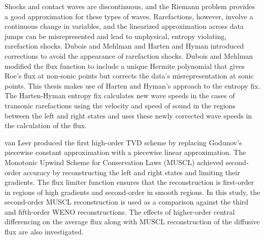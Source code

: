 Shocks and contact waves are discontinuous, and the Riemann problem provides a good approximation for these types of waves. Rarefactions, however, involve a continuous change in variables, and the linearized approximation across data jumps can be misrepresented and lead to unphysical, entropy violating, rarefaction shocks.  Dubois and Mehlman \cite{DUBOISMEHLMAN1993311} and Harten and Hyman \cite{HARTEN1983235} introduced corrections to avoid the appearance of rarefaction shocks. Dubois and Mehlman modified the flux function to include a unique Hermite polynomial that gives Roe's flux at non-sonic points but corrects the data's misrepresentation at sonic points. This thesis makes use of Harten and Hyman's approach to the entropy fix. The Harten-Hyman entropy fix calculates new wave speeds in the cases of transonic rarefactions using the velocity and speed of sound in the regions between the left and right states and uses these newly corrected wave speeds in the calculation of the flux.

van Leer \cite{VANLEER1979101} produced the first high-order TVD scheme by replacing Godunov's piecewise constant approximation with a piecewise linear approximation. The Monotonic Upwind Scheme for Conservation Laws (MUSCL) achieved second-order accuracy by reconstructing the left and right states and limiting their gradients. The flux limiter function ensures that the reconstruction is first-order in regions of high gradients and second-order in smooth regions. In this study, the second-order MUSCL reconstruction is used as a comparison against the third and fifth-order WENO reconstructions. The effects of higher-order central differencing on the average flux along with MUSCL reconstruction of the diffusive flux are also investigated.


